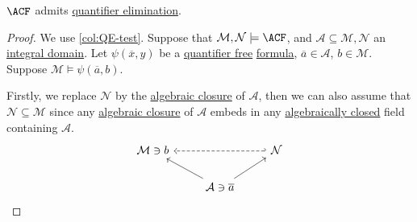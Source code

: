 \begin{theorem}
	\(\ACF\) admits \hyperref[def:quantifier-elimination]{quantifier elimination}.
\end{theorem}
\begin{proof}
	We use \autoref{col:QE-test}. Suppose that \(\mathcal{M} , \mathcal{N} \models \ACF\), and \(\mathcal{A} \subseteq \mathcal{M} , \mathcal{N} \) an \hyperref[def:integral-domain]{integral domain}. Let \(\psi (\overline{x} , y)\) be a \hyperref[not:quantifier-free]{quantifier free} \hyperref[def:formula]{formula}, \(\overline{a} \in \mathcal{A} \), \(b\in \mathcal{M} \). Suppose \(\mathcal{M} \models \psi (\overline{a} , b)\).

	Firstly, we replace \(\mathcal{N} \) by the \hyperref[def:algebraic-closure]{algebraic closure} of \(\mathcal{A} \), then we can also assume that \(\mathcal{N} \subseteq \mathcal{M} \) since any \hyperref[def:algebraic-closure]{algebraic closure} of \(\mathcal{A} \) embeds in any \hyperref[def:algebraically-closed]{algebraically closed} field containing \(\mathcal{A} \).
	\[
		\begin{tikzcd}
			{\mathcal{M} \ni b} && {\mathcal{N}} \\
			& {\mathcal{A}\ni \overline{a}}
			\arrow[from=2-2, to=1-3]
			\arrow[from=2-2, to=1-1]
			\arrow[dashed, hook', from=1-3, to=1-1]
		\end{tikzcd}
	\]


\end{proof}
